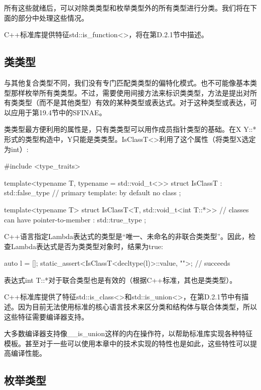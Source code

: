 所有这些就绪后，可以对除类类型和枚举类型外的所有类型进行分类。我们将在下面的部分中处理这些情况。

C++标准库提供特征std::is\_function<>，将在第D.2.1节中描述。

\subsection{类类型}

与其他复合类型不同，我们没有专门匹配类类型的偏特化模式。也不可能像基本类型那样枚举所有类类型。不过，需要使用间接方法来标识类类型，方法是提出对所有类类型（而不是其他类型）有效的某种类型或表达式。对于这种类型或表达，可以应用于第19.4节中的SFINAE。

类类型最方便利用的属性是，只有类类型可以用作成员指针类型的基础。在X Y::*形式的类型构造中，Y只能是类类型。IsClassT<>利用了这个属性（将类型X选定为int）:

\begin{cpp}
#include <type_traits>

template<typename T, typename = std::void_t<>>
struct IsClassT : std::false_type { // primary template: by default no class
};

template<typename T>
struct IsClassT<T, std::void_t<int T::*>> // classes can have pointer-to-member
: std::true_type {
};
\end{cpp}

C++语言指定Lambda表达式的类型是“唯一、未命名的非联合类类型”。因此，检查Lambda表达式是否为类类型对象时，结果为true:

\begin{cpp}
auto l = []{};
static_assert<IsClassT<decltype(l)>::value, "">; // succeeds
\end{cpp}

表达式int T::*对于联合类型也是有效的（根据C++标准，其也是类类型）。

C++标准库提供了特征std::is\_class<>和std::is\_union<>，在第D.2.1节中有描述。因为目前无法使用标准的核心语言技术来区分类和结构体与联合体类型，所以这些特征需要编译器支持。

\begin{notice}
大多数编译器支持像\_\_is\_union这样的内在操作符，以帮助标准库实现各种特征模板。甚至对于一些可以使用本章中的技术实现的特性也是如此，这些特性可以提高编译性能。
\end{notice}

\subsection{枚举类型}

